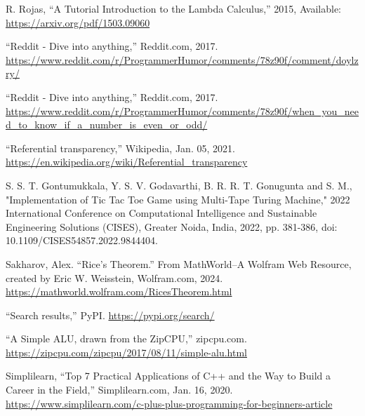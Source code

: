 \documentclass[12pt]{report} %
\begin{document}
\begin{singlespace}
\begin{thebibliography}{}
             R. Rojas, “A Tutorial Introduction to the Lambda Calculus,” 2015, Available: \href{https://arxiv.org/pdf/1503.09060}{https://arxiv.org/pdf/1503.09060}
            
             “Reddit - Dive into anything,” Reddit.com, 2017. \href{https://www.reddit.com/r/ProgrammerHumor/comments/78z90f/comment/doylzry/}{https://www.reddit.com/r/ProgrammerHu\-mor/comments/78z90f/comment/doylzry/}
            
             “Reddit - Dive into anything,” Reddit.com, 2017. \href{https://www.reddit.com/r/ProgrammerHumor/comments/78z90f/when_you_need_to_know_if_a_number_is_even_or_odd/}{https://www.reddit.com/r/ProgrammerHu\-mor/comments/78z90f/when\_you\_need\_to\_know\_if\_a\_number\_is\_even\_or\_odd/} 
            
             “Referential transparency,” Wikipedia, Jan. 05, 2021. \href{https://en.wikipedia.org/wiki/Referential\_transparency}{https://en.wikipedia.org/wiki/Referential\_transparency}
            
             S. S. T. Gontumukkala, Y. S. V. Godavarthi, B. R. R. T. Gonugunta and S. M., "Implementation of Tic Tac Toe Game using Multi-Tape Turing Machine," 2022 International Conference on Computational Intelligence and Sustainable Engineering Solutions (CISES), Greater Noida, India, 2022, pp. 381-386, doi: 10.1109/CISES54857.2022.9844404.

             Sakharov, Alex. “Rice’s Theorem.” From MathWorld--A Wolfram Web Resource, created by Eric W. Weisstein, Wolfram.com, 2024. \href{https://mathworld.wolfram.com/RicesTheorem.html}{https://mathworld.wolfram.com/RicesTheorem.html}
            
             “Search results,” PyPI. \href{https://pypi.org/search/}{https://pypi.org/search/}
            
             “A Simple ALU, drawn from the ZipCPU,” zipcpu.com. \href{https://zipcpu.com/zipcpu/2017/08/11/simple-alu.html}{https://zipcpu.com/zipcpu/2017/08/11/simple-alu.html}
            
             Simplilearn, “Top 7 Practical Applications of C++ and the Way to Build a Career in the Field,” Simplilearn.com, Jan. 16, 2020. \href{https://www.simplilearn.com/c-plus-plus-programming-for-beginners-article}{https://www.simplilearn.com/c-plus-plus-programming-for-beginners-article}
            

\end{thebibliography}
\end{singlespace}
\end{document}
